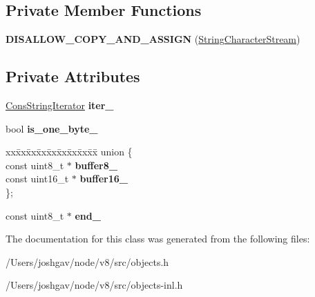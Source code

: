 \subsection*{Private Member Functions}
\begin{DoxyCompactItemize}
\item 
{\bfseries D\+I\+S\+A\+L\+L\+O\+W\+\_\+\+C\+O\+P\+Y\+\_\+\+A\+N\+D\+\_\+\+A\+S\+S\+I\+GN} (\hyperlink{classv8_1_1internal_1_1_string_character_stream}{String\+Character\+Stream})\hypertarget{classv8_1_1internal_1_1_string_character_stream_ac953f80feda4c2b1f69f7f635b13059c}{}\label{classv8_1_1internal_1_1_string_character_stream_ac953f80feda4c2b1f69f7f635b13059c}

\end{DoxyCompactItemize}
\subsection*{Private Attributes}
\begin{DoxyCompactItemize}
\item 
\hyperlink{classv8_1_1internal_1_1_cons_string_iterator}{Cons\+String\+Iterator} {\bfseries iter\+\_\+}\hypertarget{classv8_1_1internal_1_1_string_character_stream_a7646a660e8eb0743f2a6dee198f3472c}{}\label{classv8_1_1internal_1_1_string_character_stream_a7646a660e8eb0743f2a6dee198f3472c}

\item 
bool {\bfseries is\+\_\+one\+\_\+byte\+\_\+}\hypertarget{classv8_1_1internal_1_1_string_character_stream_ab3b56a9f9bc2ef89bb1f3394d67c9123}{}\label{classv8_1_1internal_1_1_string_character_stream_ab3b56a9f9bc2ef89bb1f3394d67c9123}

\item 
\begin{tabbing}
xx\=xx\=xx\=xx\=xx\=xx\=xx\=xx\=xx\=\kill
union \{\\
\>const uint8\_t $\ast$ {\bfseries buffer8\_}\\
\>const uint16\_t $\ast$ {\bfseries buffer16\_}\\
\}; \hypertarget{classv8_1_1internal_1_1_string_character_stream_a023de0fe081c949516c4f24b57026518}{}\label{classv8_1_1internal_1_1_string_character_stream_a023de0fe081c949516c4f24b57026518}
\\

\end{tabbing}\item 
const uint8\+\_\+t $\ast$ {\bfseries end\+\_\+}\hypertarget{classv8_1_1internal_1_1_string_character_stream_a756c206520f22ffe6ce27c24ac1a5e37}{}\label{classv8_1_1internal_1_1_string_character_stream_a756c206520f22ffe6ce27c24ac1a5e37}

\end{DoxyCompactItemize}


The documentation for this class was generated from the following files\+:\begin{DoxyCompactItemize}
\item 
/\+Users/joshgav/node/v8/src/objects.\+h\item 
/\+Users/joshgav/node/v8/src/objects-\/inl.\+h\end{DoxyCompactItemize}
